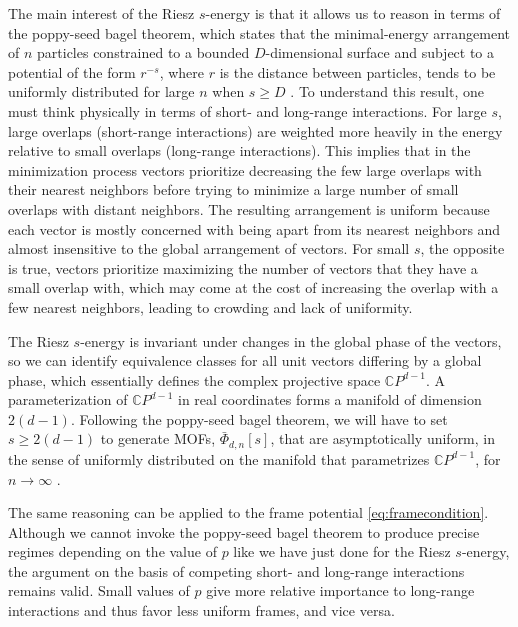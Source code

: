 \documentclass[%
superscriptaddress,
amsmath,amssymb,
 aps,
pra,
floatfix,
]{revtex4-2}
\begin{document}
The main interest of the Riesz $s$-energy is that it allows us to reason in terms of the poppy-seed bagel theorem, which states that the minimal-energy arrangement of $n$ particles constrained to a bounded $D$-dimensional surface and subject to a potential of the form $r^{-s}$, where $r$ is the distance between particles, tends to be uniformly distributed for large $n$ when $s \geq D$ \cite{hardin2004discretizing}. 
To understand this result, one must think physically in terms of short- and long-range interactions. For large $s$, large overlaps (short-range interactions) are weighted more heavily in the energy relative to small overlaps (long-range interactions). This implies that in the minimization process vectors prioritize decreasing the few large overlaps with their nearest neighbors before trying to minimize a large number of small overlaps with distant neighbors. The resulting arrangement is uniform because each vector is mostly concerned with being apart from its nearest neighbors and almost insensitive to the global arrangement of vectors. For small $s$, the opposite is true, vectors prioritize maximizing the number of vectors that they have a small overlap with, which may come at the cost of increasing the overlap with a few nearest neighbors, leading to crowding and lack of uniformity. 

The Riesz $s$-energy is invariant under changes in the global phase of the vectors, so we can identify equivalence classes for all unit vectors differing by a global phase, which essentially defines the complex projective space $\mathbb CP^{d-1}$. A parameterization of $\mathbb CP^{d-1}$ in real coordinates forms a manifold of dimension $2(d-1)$. Following the poppy-seed bagel theorem, we will have to set $s \geq 2(d-1)$ to generate MOFs, $\bar \Phi_{d, n}[s]$, that are asymptotically uniform, in the sense of uniformly distributed on the manifold that parametrizes $\mathbb CP^{d-1}$, for $n \to \infty$ \cite{chen2020on}.

The same reasoning can be applied to the frame potential \eqref{eq:framecondition}. Although we cannot invoke the poppy-seed bagel theorem to produce precise regimes depending on the value of $p$ like we have just done for the Riesz $s$-energy, the argument on the basis of competing short- and long-range interactions remains valid. Small values of $p$ give more relative importance to long-range interactions and thus favor less uniform frames, and vice versa.
\end{document}
